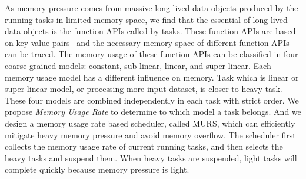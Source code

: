As memory pressure comes from massive long lived data objects produced by the running tasks in limited memory space, we find that the essential of long lived data objects is the function APIs called by tasks. These function APIs are based on key-value pairs~\cite{dean2008mapreduce, zaharia2012resilient, hueske2012opening, isard2007dryad} and the necessary memory space of different function APIs can be traced. The memory usage of these function APIs can be classified in four coarse-grained models: constant, sub-linear, linear, and super-linear. Each memory usage model has a different influence on memory. Task which is linear or super-linear model, or processing more input dataset, is closer to heavy task. These four models are combined independently in each task with strict order. We propose \textit{Memory Usage Rate} to determine to which model a task belongs. And we design a memory usage rate based scheduler, called MURS, which can efficiently mitigate heavy memory pressure and avoid memory overflow. The scheduler first collects the memory usage rate of current running tasks, and then selects the heavy tasks and suspend them. When heavy tasks are suspended, light tasks will complete quickly because memory pressure is light.



